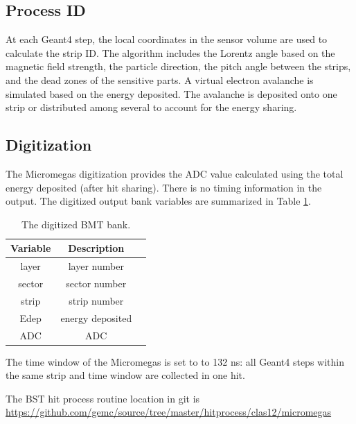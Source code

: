 \subsection{Process ID}
At each Geant4 step, the local coordinates in the sensor volume are used to calculate the strip ID.
The algorithm includes the Lorentz angle based on the magnetic field strength, the particle direction,
the pitch angle between the strips, and the dead zones of the sensitive parts.
A virtual electron avalanche is simulated based on the energy deposited. The avalanche
is deposited onto one strip or distributed among several to account for the energy sharing.



\subsection{Digitization}

The Micromegas digitization provides the ADC value calculated using the total energy deposited (after hit sharing).
There is no timing information in the output.
The digitized output bank variables are summarized in Table \ref{tab:mmBank}.

\begin{table}[h]
	\begin{center}
		\begin{tabular}{| c | c | c |}
			\hline \hline
			Variable & Description  \\
			\hline
              layer  &      layer number   \\
             sector  &     sector number   \\
              strip  &      strip number   \\
               Edep  &  energy deposited   \\
                ADC  &               ADC   \\
			\hline \hline
		\end{tabular}
	\end{center}
	\caption{The digitized BMT bank.}\label{tab:mmBank}
\end{table}

The time window  of the Micromegas is set to to 132 ns: all Geant4 steps within the same strip and time window are collected in one hit.

The BST hit process routine location in git is \url{https://github.com/gemc/source/tree/master/hitprocess/clas12/micromegas}

